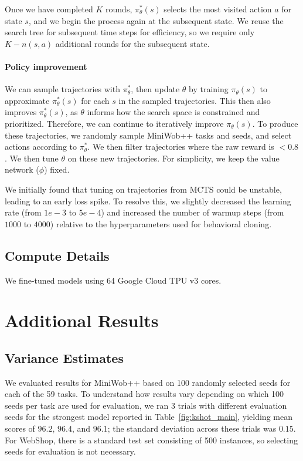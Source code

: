 Once we have completed $K$ rounds, $\pi^*_\theta(s)$ selects the most visited action $a$ for state $s$, and we begin the process again at the subsequent state. We reuse the search tree for subsequent time steps for efficiency, so we require only $K - n(s,a)$ additional rounds for the subsequent state.

\paragraph{Policy improvement} We can sample trajectories with $\pi^*_\theta$, then update $\theta$ by training $\pi_\theta(s)$ to approximate $\pi^*_\theta(s)$ for each $s$ in the sampled trajectories. This then also improves $\pi^*_\theta(s)$, as $\theta$ informs how the search space is constrained and prioritized. Therefore, we can continue to iteratively improve $\pi_\theta(s)$. To produce these trajectories, we randomly sample MiniWob++ tasks and seeds, and select actions according to $\pi^*_\theta$. We then filter trajectories where the raw reward is $< 0.8$. We then tune $\theta$ on these new trajectories. For simplicity, we keep the value network (\ie $\phi$) fixed.

We initially found that tuning on trajectories from MCTS could be unstable, leading to an early loss spike. To resolve this, we slightly decreased the learning rate (from $1e-3$ to $5e-4$) and increased the number of warmup steps (from $1000$ to $4000$) relative to the hyperparameters used for behavioral cloning.

\subsection{Compute Details} We fine-tuned models using 64 Google Cloud TPU v3 cores.

\section{Additional Results}
\label{sec:appendix-c}

\subsection{Variance Estimates}

We evaluated results for MiniWob++ based on 100 randomly selected seeds for each of the 59 tasks. To understand how results vary depending on which 100 seeds per task are used for evaluation, we ran 3 trials with different evaluation seeds for the strongest \ours model reported in Table~\ref{fig:kshot_main}, yielding mean scores of $96.2$, $96.4$, and $96.1$; the standard deviation across these trials was $0.15$. For WebShop, there is a standard test set consisting of 500 instances, so selecting seeds for evaluation is not necessary.

